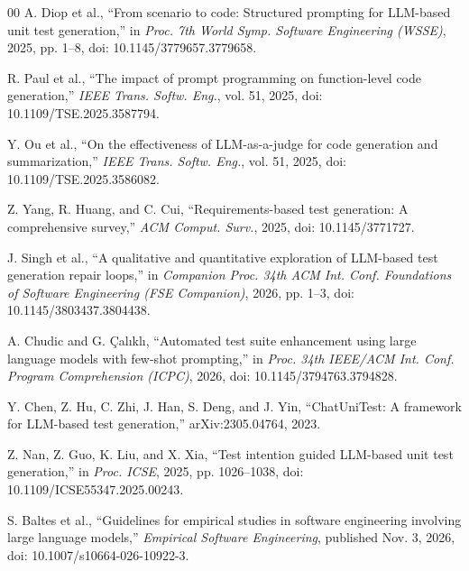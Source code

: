 \begin{thebibliography}{00}
A. Diop et al., ``From scenario to code: Structured prompting for LLM-based unit test generation,'' in \emph{Proc. 7th World Symp. Software Engineering (WSSE)}, 2025, pp. 1--8, doi: 10.1145/3779657.3779658.

R. Paul et al., ``The impact of prompt programming on function-level code generation,'' \emph{IEEE Trans. Softw. Eng.}, vol. 51, 2025, doi: 10.1109/TSE.2025.3587794.

Y. Ou et al., ``On the effectiveness of LLM-as-a-judge for code generation and summarization,'' \emph{IEEE Trans. Softw. Eng.}, vol. 51, 2025, doi: 10.1109/TSE.2025.3586082.

Z. Yang, R. Huang, and C. Cui, ``Requirements-based test generation: A comprehensive survey,'' \emph{ACM Comput. Surv.}, 2025, doi: 10.1145/3771727.

J. Singh et al., ``A qualitative and quantitative exploration of LLM-based test generation repair loops,'' in \emph{Companion Proc. 34th ACM Int. Conf. Foundations of Software Engineering (FSE Companion)}, 2026, pp. 1--3, doi: 10.1145/3803437.3804438.

A. Chudic and G. \c{C}al\i kl\i, ``Automated test suite enhancement using large language models with few-shot prompting,'' in \emph{Proc. 34th IEEE/ACM Int. Conf. Program Comprehension (ICPC)}, 2026, doi: 10.1145/3794763.3794828.

Y. Chen, Z. Hu, C. Zhi, J. Han, S. Deng, and J. Yin, ``ChatUniTest: A framework for LLM-based test generation,'' arXiv:2305.04764, 2023.

Z. Nan, Z. Guo, K. Liu, and X. Xia, ``Test intention guided LLM-based unit test generation,'' in \emph{Proc. ICSE}, 2025, pp. 1026--1038, doi: 10.1109/ICSE55347.2025.00243.

S. Baltes et al., ``Guidelines for empirical studies in software engineering involving large language models,'' \emph{Empirical Software Engineering}, published Nov. 3, 2026, doi: 10.1007/s10664-026-10922-3.
\end{thebibliography}
